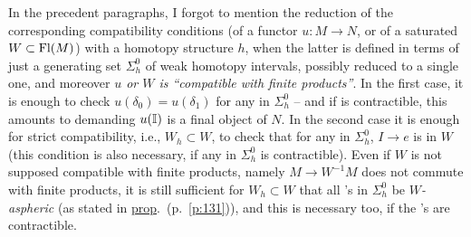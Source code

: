 In the precedent paragraphs, I forgot to mention the reduction of the
corresponding compatibility conditions (of a functor $u:M\to N$, or of
a saturated $W\subset\operatorname{Fl}(M)$) with a homotopy structure $h$, when the
latter is defined in terms of just a generating set $\Sigma_h^0$ of
weak homotopy intervals, possibly reduced to a single one, and
moreover \emph{$u$ or $W$ is ``compatible with finite products''}. In
the first case, it is enough to check $u(\delta_0)=u(\delta_1)$ for
any \bI{} in $\Sigma_h^0$ -- and if \bI{} is contractible, this
amounts to demanding $u({\mathbb{I}})$ is a final object of $N$. In the second
case it is enough for strict compatibility, i.e., $W_h\subset W$, to
check that for any \bI{} in $\Sigma_h^0$, $I\to e$ is in $W$ (this
condition is also necessary, if any \bI{} in $\Sigma_h^0$ is
contractible). Even if $W$ is not supposed compatible with finite
products, namely $M\to W^{-1}M$ does not commute with finite products,
it is still sufficient for $W_h\subset W$ that all \bI's in
$\Sigma_h^0$ be \emph{$W$-aspheric} (as stated in
\hyperref[prop:54]{prop}.\ (p.\ \ref{p:131})), and this is necessary
too, if the \bI's are contractible.

\bigbreak

\noindent\hfill{}\par

